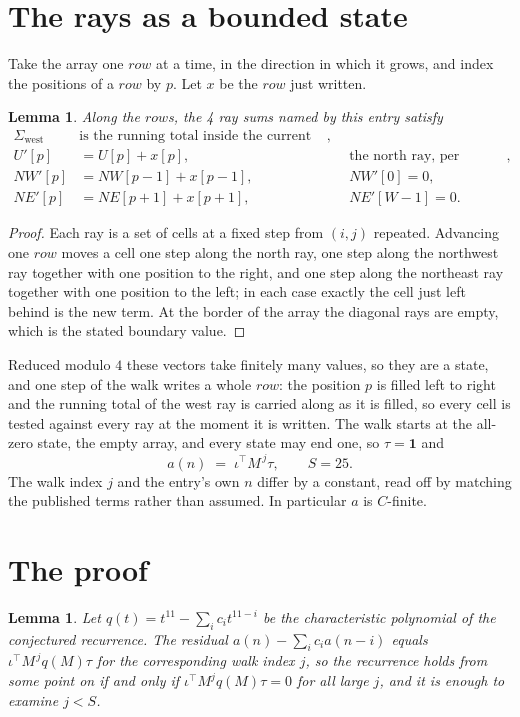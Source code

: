 \documentclass[11pt,a4paper]{article}
\theoremstyle{plain}
\newtheorem{lemma}[theorem]{Lemma}
\theoremstyle{definition}
\begin{document}
\section{The rays as a bounded state}

Take the array one $row$ at a time, in the direction in which it grows, and index the
positions of a $row $ by $p$. Let $x$ be the $row$ just written.

\begin{lemma}\label{lem:rays}
Along the $row$s, the 4 ray sums named by this entry satisfy
\[
\begin{aligned}
\Sigma_{\mathrm{west}}\ &\text{is the running total inside the current row},\\
U'[p]&=U[p]+x[p], &&\text{the north ray, per position},\\
NW'[p]&=NW[p-1]+x[p-1], && NW'[0]=0,\\
NE'[p]&=NE[p+1]+x[p+1], && NE'[W-1]=0 .
\end{aligned}
\]
\end{lemma}

\begin{proof}
Each ray is a set of cells at a fixed step from $(i,j)$ repeated. Advancing one $row$
moves a cell one step along the north ray, one step along the northwest ray together with one
position to the right, and one step along the northeast ray together with one position to the
left; in each case exactly the cell just left behind is the new term. At the border of the
array the diagonal rays are empty, which is the stated boundary value.
\end{proof}

Reduced modulo $4$ these vectors take finitely many values, so they are a state, and one step
of the walk writes a whole $row$: the position $p$ is filled left to right and the
running total of the west ray is carried along as it is filled, so every cell is tested
against every ray at the moment it is written. The walk starts at the all-zero state, the empty
array, and every state may end one, so $\tau=\mathbf{1}$ and
\[
a(n)\;=\;\iota^{\!\top}M^{\,j}\tau ,\qquad S=25.
\]
The walk index $j$ and the entry's own $n$ differ by a constant, read off by matching the
published terms rather than assumed. In particular $a$ is $C$-finite.

\section{The proof}

\begin{lemma}\label{lem:crit}
Let $q(t)=t^{11}-\sum_i c_it^{11-i}$ be the characteristic polynomial of the
conjectured recurrence. The residual $a(n)-\sum_ic_ia(n-i)$ equals
$\iota^{\!\top}M^{\,j}q(M)\tau$ for the corresponding walk index $j$, so the recurrence
holds from some point on if and only if $\iota^{\!\top}M^{j}q(M)\tau=0$ for all large $j$,
and it is enough to examine $j<S$.
\end{lemma}
\end{document}
